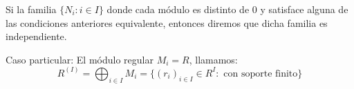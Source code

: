 \begin{df}[Independencia]
  Si la familia \(\{N_i:i\in I\}\) donde cada módulo es distinto de 0 y
  satisface alguna de las condiciones anteriores equivalente, entonces
  diremos que dicha familia es independiente.
\end{df}

\begin{df}
  Caso particular: El módulo regular \(M_i=R\), llamamos:
  \[
    R^{(I)}=\bigoplus_{i\in I} M_i=\{
      {(r_i)}_{i\in I}\in R^I:\textrm{ con soporte finito}\}
  \]
\end{df}

